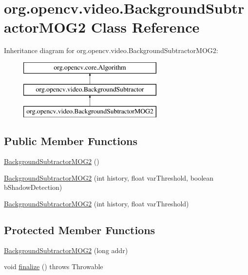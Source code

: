 \hypertarget{classorg_1_1opencv_1_1video_1_1_background_subtractor_m_o_g2}{}\section{org.\+opencv.\+video.\+Background\+Subtractor\+M\+O\+G2 Class Reference}
\label{classorg_1_1opencv_1_1video_1_1_background_subtractor_m_o_g2}
Inheritance diagram for org.\+opencv.\+video.\+Background\+Subtractor\+M\+O\+G2\+:\begin{figure}[H]
\begin{center}
\leavevmode
\includegraphics[height=3.000000cm]{classorg_1_1opencv_1_1video_1_1_background_subtractor_m_o_g2}
\end{center}
\end{figure}
\subsection*{Public Member Functions}
\begin{DoxyCompactItemize}
\item 
\mbox{\hyperlink{classorg_1_1opencv_1_1video_1_1_background_subtractor_m_o_g2_abce8f64544804293fb3119e7ae31e5ec}{Background\+Subtractor\+M\+O\+G2}} ()
\item 
\mbox{\hyperlink{classorg_1_1opencv_1_1video_1_1_background_subtractor_m_o_g2_a59eebcd3dbe21ecae1712afc5b2a9734}{Background\+Subtractor\+M\+O\+G2}} (int history, float var\+Threshold, boolean b\+Shadow\+Detection)
\item 
\mbox{\hyperlink{classorg_1_1opencv_1_1video_1_1_background_subtractor_m_o_g2_a77ff8a1b46fbe10db2e3df013226815a}{Background\+Subtractor\+M\+O\+G2}} (int history, float var\+Threshold)
\end{DoxyCompactItemize}
\subsection*{Protected Member Functions}
\begin{DoxyCompactItemize}
\item 
\mbox{\hyperlink{classorg_1_1opencv_1_1video_1_1_background_subtractor_m_o_g2_a39873d6e657374eb3f7a559c82dc09f5}{Background\+Subtractor\+M\+O\+G2}} (long addr)
\item 
void \mbox{\hyperlink{classorg_1_1opencv_1_1video_1_1_background_subtractor_m_o_g2_a1892c1c11287e7c0e305271f0472027c}{finalize}} ()  throws Throwable 
\end{DoxyCompactItemize}

